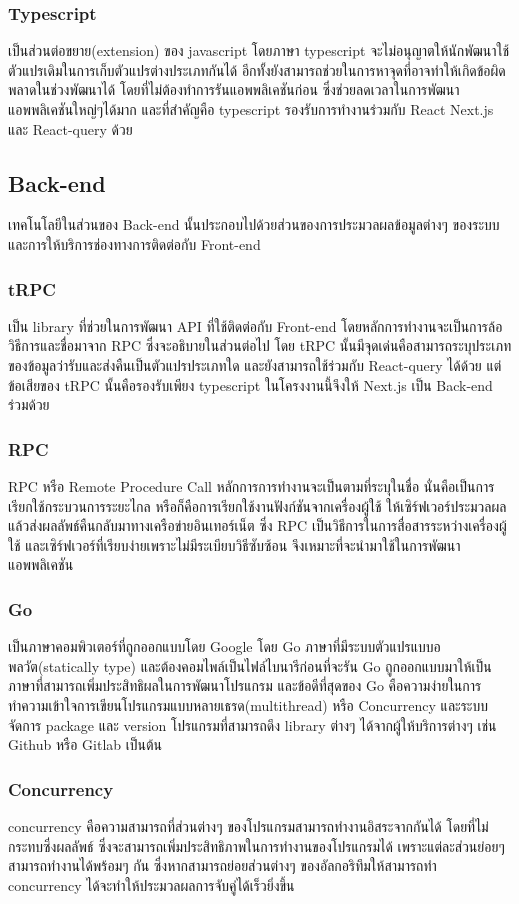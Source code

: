 \subsubsection{Typescript}
เป็นส่วนต่อขยาย(extension) ของ javascript โดยภาษา typescript จะไม่อนุญาตให้นักพัฒนาใช้ตัวแปรเดิมในการเก็บตัวแปรต่างประเภทกันได้
อีกทั้งยังสามารถช่วยในการหาจุดที่อาจทำให้เกิดข้อผิดพลาดในช่วงพัฒนาได้ โดยที่ไม่ต้องทำการรันแอพพลิเคชันก่อน ซึ่งช่วยลดเวลาในการพัฒนาแอพพลิเคชันใหญ่ๆได้มาก
และที่สำคัญคือ typescript รองรับการทำงานร่วมกับ React Next.js และ React-query ด้วย
\subsection{Back-end}
เทคโนโลยีในส่วนของ Back-end นั้นประกอบไปด้วยส่วนของการประมวลผลข้อมูลต่างๆ ของระบบ และการให้บริการช่องทางการติดต่อกับ Front-end
\subsubsection{tRPC}
เป็น library ที่ช่วยในการพัฒนา API ที่ใช้ติดต่อกับ Front-end โดยหลักการทำงานจะเป็นการล้อวิธีการและชื่อมาจาก RPC ซึ่งจะอธิบายในส่วนต่อไป
โดย tRPC นั้นมีจุดเด่นคือสามารถระบุประเภทของข้อมูลว่ารับและส่งคืนเป็นตัวแปรประเภทใด และยังสามารถใช้ร่วมกับ React-query ได้ด้วย แต่ข้อเสียของ tRPC นั้นคือรองรับเพียง typescript
ในโครงงานนี้จึงให้ Next.js เป็น Back-end ร่วมด้วย
\subsubsection{RPC}
RPC หรือ Remote Procedure Call หลักการการทำงานจะเป็นตามที่ระบุในชื่อ นั่นคือเป็นการเรียกใช้กระบวนการระยะไกล หรือก็คือการเรียกใช้งานฟังก์ชันจากเครื่องผู้ใช้ 
ให้เซิร์ฟเวอร์ประมวลผลแล้วส่งผลลัพธ์คืนกลับมาทางเครือข่ายอินเทอร์เน็ต ซึ่ง RPC เป็นวิธีการในการสื่อสารระหว่างเครื่องผู้ใช้ และเซิร์ฟเวอร์ที่เรียบง่ายเพราะไม่มีระเบียบวิธีซับซ้อน
จึงเหมาะที่จะนำมาใช้ในการพัฒนาแอพพลิเคชัน
\subsubsection{Go}
เป็นภาษาคอมพิวเตอร์ที่ถูกออกแบบโดย Google โดย Go ภาษาที่มีระบบตัวแปรแบบอพลวัต(statically type) และต้องคอมไพล์เป็นไฟล์ไบนารีก่อนที่จะรัน
Go ถูกออกแบบมาให้เป็นภาษาที่สามารถเพิ่มประสิทธิผลในการพัฒนาโปรแกรม และข้อดีที่สุดของ Go คือความง่ายในการทำความเข้าใจการเขียนโปรแกรมแบบหลายเธรด(multithread) หรือ Concurrency
และระบบจัดการ package และ version โปรแกรมที่สามารถดึง library ต่างๆ ได้จากผู้ให้บริการต่างๆ เช่น Github  หรือ Gitlab เป็นต้น
\subsubsection{Concurrency}
concurrency คือความสามารถที่ส่วนต่างๆ ของโปรแกรมสามารถทำงานอิสระจากกันได้ โดยที่ไม่กระทบซึ่งผลลัพธ์ ซึ่งจะสามารถเพิ่มประสิทธิภาพในการทำงานของโปรแกรมได้ 
เพราะแต่ละส่วนย่อยๆ สามารถทำงานได้พร้อมๆ กัน ซึ่งหากสามารถย่อยส่วนต่างๆ ของอัลกอริทึมให้สามารถทำ concurrency ได้จะทำให้ประมวลผลการจับคู่ได้เร็วยิ่งขึ้น
